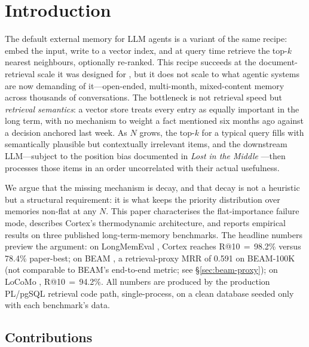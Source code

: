 \documentclass[11pt]{article}
\begin{document}
\section{Introduction}
\label{sec:intro}

The default external memory for LLM agents is a variant of the same
recipe: embed the input, write to a vector index, and at query time
retrieve the top-$k$ nearest neighbours, optionally re-ranked.  This
recipe succeeds at the document-retrieval scale it was designed for
\citep{Lewis2020}, but it does not scale to what agentic systems
are now demanding of it---open-ended, multi-month, mixed-content
memory across thousands of conversations.  The bottleneck is not
retrieval speed but \emph{retrieval semantics}: a vector store
treats every entry as equally important in the long term, with no
mechanism to weight a fact mentioned six months ago against a
decision anchored last week.  As $N$ grows, the top-$k$ for a
typical query fills with semantically plausible but contextually
irrelevant items, and the downstream LLM---subject to the position
bias documented in \emph{Lost in the Middle} \citep{Liu2023}---then
processes those items in an order uncorrelated with their actual
usefulness.

We argue that the missing mechanism is decay, and that decay is not
a heuristic but a structural requirement: it is what keeps the
priority distribution over memories non-flat at any $N$.  This paper
characterises the flat-importance failure mode, describes Cortex's
thermodynamic architecture, and reports empirical results on three
published long-term-memory benchmarks.  The headline numbers preview
the argument: on LongMemEval \citep{Wu2025}, Cortex reaches
R@10\,$=$\,98.2\% versus 78.4\% paper-best; on BEAM
\citep{Tavakoli2026}, a retrieval-proxy MRR of 0.591 on BEAM-100K
(not comparable to BEAM's end-to-end metric; see
\S\ref{sec:beam-proxy}); on
LoCoMo \citep{Maharana2024}, R@10\,$=$\,94.2\%.  All numbers are
produced by the production PL/pgSQL retrieval code path,
single-process, on a clean database seeded only with each
benchmark's data.

\subsection{Contributions}
\label{sec:contributions}
\end{document}
